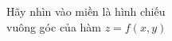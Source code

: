 \documentclass[preview]{standalone}
\begin{document}
\begin{center}
Hãy nhìn vào miền  là hình chiếu\\vuông góc của hàm $z = f(x, y)$
\end{center}
\end{document}
